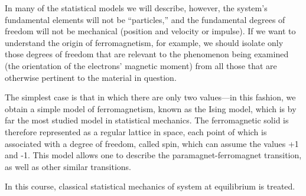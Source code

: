 \documentclass[11pt, a4paper, twoside, openright]{book}
\begin{document}
In many of the statistical models we will describe, however, the system's fundamental elements will not be “particles,” and the fundamental degrees of freedom will not be mechanical (position and velocity or impulse). If we want to understand the origin of ferromagnetism, for example, we should isolate only those degrees of freedom that are relevant to the phenomenon being examined (the orientation of the electrons’ magnetic moment) from all those that are otherwise pertinent to the material in question.

The simplest case is that in which there are only two values—in this fashion, we obtain a simple model of ferromagnetism, known as the Ising model, which is by far the most studied model in statistical mechanics. The ferromagnetic solid is therefore represented as a regular lattice in space, each point of which is associated with a degree of freedom, called spin, which can assume the values +1 and -1. This model allows one to describe the paramagnet-ferromagnet transition, as well as other similar transitions.

In this course, classical statistical mechanics of system at equilibrium is treated. 

\end{document}
